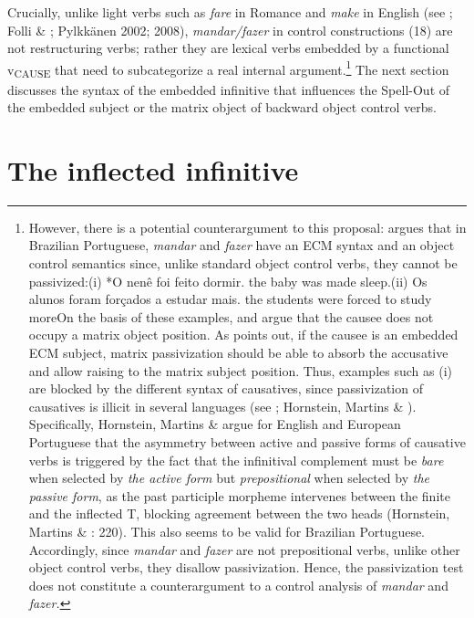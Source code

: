 \documentclass[output=paper]{langsci/langscibook}
\begin{document}
Crucially, unlike light verbs such as \textit{fare} in Romance and \textit{make} in English (see \citealt{Guasti1996}; Folli \& \citealt{Harley2007}; Pylkkänen 2002; 2008), \textit{mandar/fazer} in control constructions (18) are not restructuring verbs; rather they are lexical verbs embedded by a functional v\textsubscript{CAUSE}  that need to subcategorize a real internal argument.\footnote{However, there is a potential counterargument to this proposal: \citet{Farrell1995} argues that in Brazilian Portuguese, \textit{mandar} and \textit{fazer} have an ECM syntax and an object control semantics since, unlike standard object control verbs, they cannot be passivized:(i)  *O nenê   foi feito    dormir.  the baby  was made  sleep.(ii)  Os alunos    foram forçados  a  estudar  mais.  the students were  forced      to study  moreOn the basis of these examples, \citet{Farrell1995} and \citet{Hornstein2003} argue that the causee does not occupy a matrix object position. As \citet{Landau2004} points out, if the causee is an embedded ECM subject, matrix passivization should be able to absorb the accusative and allow raising to the matrix subject position.   Thus, examples such as (i) are blocked by the different syntax of causatives, since passivization of causatives is illicit in several languages (see \citealt{Landau2004}; Hornstein, Martins \& \citealt{Nunes2008}). Specifically, Hornstein, Martins \& \citet{Nunes2008} argue for English and European Portuguese that the asymmetry between active and passive forms of causative verbs is triggered by the fact that the infinitival complement must be \textit{bare} when selected by \textit{the active form} but \textit{prepositional} when selected by \textit{the passive form}, as the past participle morpheme intervenes between the finite and the inflected T, blocking agreement between the two heads (Hornstein, Martins \& \citealt{Nunes2008}: 220).  This also seems to be valid for Brazilian Portuguese. Accordingly, since \textit{mandar} and \textit{fazer} are not prepositional verbs, unlike other object control verbs, they disallow passivization. Hence, the passivization test does not constitute a counterargument to a control analysis of \textit{mandar} and \textit{fazer.}} The next section discusses the syntax of the embedded infinitive that influences the Spell-Out of the embedded subject or the matrix object of backward object control verbs. 

\section{The inflected infinitive}%
\end{document}

